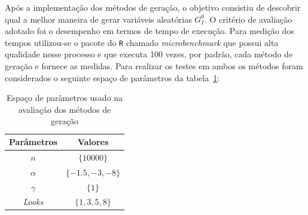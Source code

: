 Após a implementação dos métodos de geração, o objetivo consistiu de descobrir qual a melhor maneira de gerar variáveis aleatórias $G_I^0$. O critério de avaliação adotado foi o desempenho em termos de tempo de execução. Para medição dos tempos utilizou-se o pacote do \texttt{R} chamado \textit{microbenchmark} que possui alta qualidade nesse processo e que executa 100 vezes, por padrão, cada método de geração e fornece as medidas. Para realizar os testes em ambos os métodos foram considerados o seguinte espaço de parâmetros da tabela~\ref{tab:tabela_parameters_3}:
\begin{table}[H]
\centering
\caption{Espaço de parâmetros usado na avaliação dos métodos de geração}
\label{tab:tabela_parameters_3}
\begin{tabular}{c|c}
\toprule 
\multicolumn{1}{c|}{Parâmetros} & \multicolumn{1}{c}{Valores}  \\ 
\midrule
\rowcolor[gray]{.9} 
$n$ & $\{10000\}$ \\ \hline
$\alpha$ & $\{-1.5, -3, -8\}$ \\ \hline
\rowcolor[gray]{.9} $\gamma$ & $\{1\}$ \\ \hline
\textit{Looks} & $\{1, 3, 5, 8\}$ \\ 
\bottomrule
\end{tabular}
\end{table}

